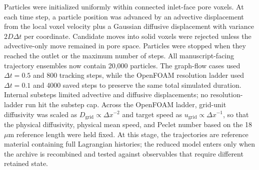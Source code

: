 \documentclass[11pt]{article}
\begin{document}
Particles were initialized uniformly within connected inlet-face pore voxels. At each time step, a particle position was advanced by an advective displacement from the local voxel velocity plus a Gaussian diffusive displacement with variance $2D\Delta t$ per coordinate. Candidate moves into solid voxels were rejected unless the advective-only move remained in pore space. Particles were stopped when they reached the outlet or the maximum number of steps. All manuscript-facing trajectory ensembles now contain 20,000 particles. The graph-flow cases used $\Delta t=0.5$ and 800 tracking steps, while the OpenFOAM resolution ladder used $\Delta t=0.1$ and 4000 saved steps to preserve the same total simulated duration. Internal substeps limited advective and diffusive displacements; no resolution-ladder run hit the substep cap. Across the OpenFOAM ladder, grid-unit diffusivity was scaled as $D_{\mathrm{grid}}\propto\Delta x^{-2}$ and target speed as $u_{\mathrm{grid}}\propto\Delta x^{-1}$, so that the physical diffusivity, physical mean speed, and Peclet number based on the 18~$\mu$m reference length were held fixed. At this stage, the trajectories are reference material containing full Lagrangian histories; the reduced model enters only when the archive is recombined and tested against observables that require different retained state.

\begin{table}[!htbp]
\centering
\caption{Trajectory ensembles used for the main validation tests. Peclet number is reported as $Pe=uL/D$ with $L=1$ grid cell for the 18~$\mu$m graph-flow cases and with the 18~$\mu$m reference length for the OpenFOAM resolution ladder. These ensembles vary regime and flow fidelity so that retained-state requirements can be separated from a single sampler ranking.}
\label{tab:regimes}
\scriptsize
{}%
\end{table}
\end{document}
